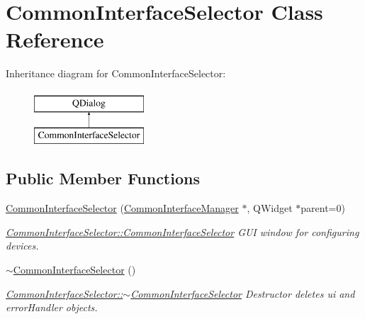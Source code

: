 \hypertarget{class_common_interface_selector}{}\section{Common\+Interface\+Selector Class Reference}
\label{class_common_interface_selector}
Inheritance diagram for Common\+Interface\+Selector\+:\begin{figure}[H]
\begin{center}
\leavevmode
\includegraphics[height=2.000000cm]{class_common_interface_selector}
\end{center}
\end{figure}
\subsection*{Public Member Functions}
\begin{DoxyCompactItemize}
\item 
\hyperlink{class_common_interface_selector_a46da3e73aa0868810dbd80a42281a6c8}{Common\+Interface\+Selector} (\hyperlink{class_common_interface_manager}{Common\+Interface\+Manager} $\ast$, Q\+Widget $\ast$parent=0)
\begin{DoxyCompactList}\small\item\em \hyperlink{class_common_interface_selector_a46da3e73aa0868810dbd80a42281a6c8}{Common\+Interface\+Selector\+::\+Common\+Interface\+Selector} G\+UI window for configuring devices. \end{DoxyCompactList}\item 
\hypertarget{class_common_interface_selector_acee1f5895e8678895f18edb5941f9160}{}\label{class_common_interface_selector_acee1f5895e8678895f18edb5941f9160} 
\hyperlink{class_common_interface_selector_acee1f5895e8678895f18edb5941f9160}{$\sim$\+Common\+Interface\+Selector} ()
\begin{DoxyCompactList}\small\item\em \hyperlink{class_common_interface_selector_acee1f5895e8678895f18edb5941f9160}{Common\+Interface\+Selector\+::$\sim$\+Common\+Interface\+Selector} Destructor deletes ui and error\+Handler objects. \end{DoxyCompactList}\end{DoxyCompactItemize}


